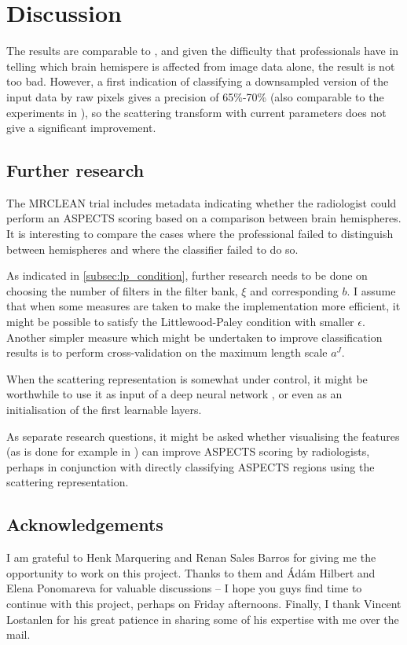 \documentclass[twocolumn, openany, oneside, article]{memoir}
\begin{document}
\chapter{Discussion}

The results are comparable to \cite{adel2017scattering}, and given the
difficulty that professionals have in telling which brain hemispere is affected
from image data alone, the result is not too bad. However, a first indication of classifying
a downsampled version of the input data by raw pixels gives a precision of
65\%-70\% (also comparable to the experiments in \cite{adel2017scattering}), so
the scattering transform with current parameters does not give a significant
improvement.

\section{Further research}

The MRCLEAN trial includes metadata indicating whether the radiologist could
perform an ASPECTS scoring based on a comparison between brain hemispheres. It is interesting
to compare the cases where the professional failed to distinguish between hemispheres and where
the classifier failed to do so.

As indicated in \autoref{subsec:lp_condition}, further research needs to be done on
choosing the number of filters in the filter bank, $\xi$ and corresponding $b$. I
assume that when some measures are taken to make the implementation more efficient,
it might be possible to satisfy the Littlewood-Paley condition with smaller $\epsilon$.
Another simpler measure which might be undertaken to improve classification results is
to perform cross-validation on the maximum length scale $a^J$.

When the scattering representation is somewhat under control, it might be worthwhile
to use it as input of a deep neural network \cite{oyallon2017scaling}, or even as an
initialisation of the first learnable layers.

As separate research questions, it might be asked whether visualising the features (as is done
for example in \cite{adel2017scattering}) can improve ASPECTS scoring by radiologists,
perhaps in conjunction with directly classifying ASPECTS regions using the scattering representation.

\section{Acknowledgements}
I am grateful to Henk Marquering and Renan Sales Barros for giving me the opportunity to work on this project.
Thanks to them and Ádám Hilbert and Elena Ponomareva for valuable discussions -- I hope you guys find time to
continue with this project, perhaps on Friday afternoons.
Finally, I thank Vincent Lostanlen for his great patience in sharing some of his expertise with me over the mail.
\end{document}
